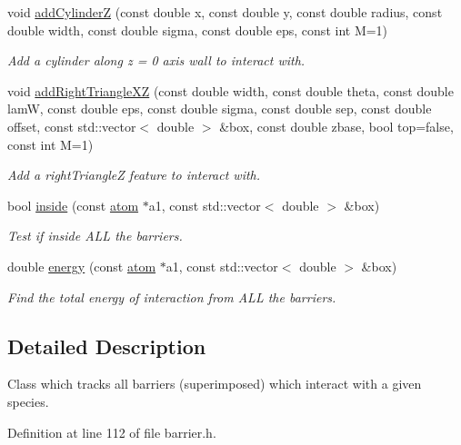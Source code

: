 \begin{DoxyCompactItemize}
void \hyperlink{classcomposite_barrier_afd40edf14705cf306c72120bb8a59042}{add\-Cylinder\-Z} (const double x, const double y, const double radius, const double width, const double sigma, const double eps, const int M=1)
\begin{DoxyCompactList}\small\item\em Add a cylinder along z = 0 axis wall to interact with. \end{DoxyCompactList}\item 
void \hyperlink{classcomposite_barrier_aea879332cf03f00463b9c8ca4ca28680}{add\-Right\-Triangle\-X\-Z} (const double width, const double theta, const double lam\-W, const double eps, const double sigma, const double sep, const double offset, const std\-::vector$<$ double $>$ \&box, const double zbase, bool top=false, const int M=1)
\begin{DoxyCompactList}\small\item\em Add a right\-Triangle\-Z feature to interact with. \end{DoxyCompactList}\item 
bool \hyperlink{classcomposite_barrier_a20989cccc8f4a14df710c2eb7cbd1e71}{inside} (const \hyperlink{classatom}{atom} $\ast$a1, const std\-::vector$<$ double $>$ \&box)
\begin{DoxyCompactList}\small\item\em Test if inside A\-L\-L the barriers. \end{DoxyCompactList}\item 
double \hyperlink{classcomposite_barrier_ac464755b3a2b31643bb70ddb84b0d399}{energy} (const \hyperlink{classatom}{atom} $\ast$a1, const std\-::vector$<$ double $>$ \&box)
\begin{DoxyCompactList}\small\item\em Find the total energy of interaction from A\-L\-L the barriers. \end{DoxyCompactList}\end{DoxyCompactItemize}


\subsection{Detailed Description}
Class which tracks all barriers (superimposed) which interact with a given species. 

Definition at line 112 of file barrier.\-h.



